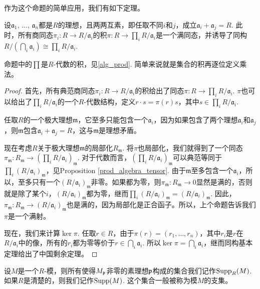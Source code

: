 作为这个命题的简单应用，我们有如下定理。

\begin{thm}[中国剩余定理]
	设$\mathfrak a_1$, $\dots$, $\mathfrak a_n$都是$R$的理想，且两两互素，即任取不同$i$和$j$，成立$\mathfrak a_i+\mathfrak a_j=R$. 此时，所有商同态$\pi_i:R\to R/\mathfrak a_i$的积$\pi:R\to \prod_i R/\mathfrak a_i$是一个满同态，并诱导了同构$R/(\bigcap_i \mathfrak a_i)\cong \prod_i R/\mathfrak a_i$.
\end{thm}

命题中的$\prod$是$R$-代数的积，见\ref{alg_prod}. 简单来说就是集合的积再逐位定义乘法。

\begin{proof}
	首先，所有典范商同态$\pi_i:R\to R/\mathfrak a_i$的积给出了同态$\pi:R\to \prod_i R/\mathfrak a_i$. $\pi$也可以给出了$\prod_i R/\mathfrak a_i$的一个$R$-代数结构，定义$r\cdot s=\pi(r)s$，其中$s\in \prod_i R/\mathfrak a_i$. 

	任取$R$的一个极大理想$\mathfrak m$，它至多只能包含一个$\mathfrak a_i$，因为如果包含了两个理想$\mathfrak a_i$和$\mathfrak a_j$，则$\mathfrak m$包含$\mathfrak a_i+\mathfrak a_j=R$，这与$\mathfrak m$是理想矛盾。

	现在考虑$R$关于极大理想$\mathfrak m$的局部化$R_{\mathfrak m}$. 将$\pi$也局部化，我们就得到了一个同态$\pi_{\mathfrak m}:R_{\mathfrak m}\to \left(\prod_i R/\mathfrak a_i\right)_{\mathfrak m}$. 对于代数而言，$\left(\prod_i R/\mathfrak a_i\right)_{\mathfrak m}$可以典范等同于$\prod_i (R/\mathfrak a_i)_{\mathfrak m}$，见Proposition \ref{prod_algebra_tensor}. 由于$\mathfrak m$至多包含一个$\mathfrak a_i$，所以，至多只有一个$(R/\mathfrak a_i)_{\mathfrak m}$非零。如果都为零，则$\pi_{\mathfrak m}:R_{\mathfrak m}\to 0$显然是满的，否则就是除了某个$i$，$(R/\mathfrak a_i)_{\mathfrak m}$都为零，继而$\prod_i (R/\mathfrak a_i)_{\mathfrak m}=(R/\mathfrak a_i)_{\mathfrak m}$. 因此，$\pi_{\mathfrak m}:R_{\mathfrak m}\to (R/\mathfrak a_i)_{\mathfrak m}$也是满的，因为局部化是正合函子。所以，上个命题告诉我们$\pi$是一个满射。

	现在，我们来计算$\ker\pi$. 任取$r\in R$，由于$\pi(r)=(r_1,\dots,r_n)$，其中$r_i$是$r$在$R/\mathfrak a_i$中的像，所有的$r_i$都为零等价于$r\in \bigcap_i \mathfrak a_i$. 所以$\ker \pi =\bigcap_i \mathfrak a_i$，继而同构基本定理给出了中国剩余定理。
\end{proof}

\begin{para}[支集]
	设$M$是一个$R$-模，则所有使得$M_{\mathfrak{p}}$非零的素理想$\mathfrak{p}$构成的集合我们记作$\operatorname{Supp}_R(M)$. 如果$R$是清楚的，则我们记作$\operatorname{Supp}(M)$. 这个集合一般被称为模$M$的支集。
\end{para}

